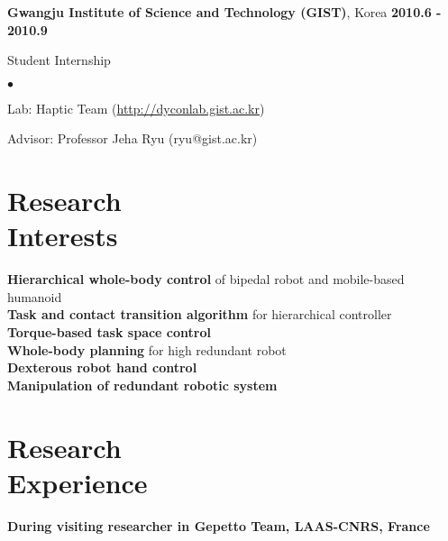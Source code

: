 \documentclass[margin,line]{res}
\newenvironment{list1}{
  \begin{list}{\ding{113}}{%
      \setlength{\itemsep}{0in}
      \setlength{\parsep}{0in} \setlength{\parskip}{0in}
      \setlength{\topsep}{0in} \setlength{\partopsep}{0in} 
      \setlength{\leftmargin}{0.17in}}}{\end{list}}
\newenvironment{list2}{
  \begin{list}{$\bullet$}{%
      \setlength{\itemsep}{0in}
      \setlength{\parsep}{0in} \setlength{\parskip}{0in}
      \setlength{\topsep}{0in} \setlength{\partopsep}{0in} 
      \setlength{\leftmargin}{0.2in}}}{\end{list}}
\begin{document}
\begin{resume}
{\bf Gwangju Institute of Science and Technology (GIST)}, Korea  \hfill {\bf 2010.6  - 2010.9} \\
\vspace*{-.1in}
\begin{list1}
\vspace*{-.05in}
\item[] Student Internship
\begin{list2}
\item Lab: Haptic Team (\url{http://dyconlab.gist.ac.kr})
\item Advisor: Professor Jeha Ryu (ryu@gist.ac.kr)
\end{list2}
\end{list1}

\section{\sc Research\\ Interests}
\textbf{Hierarchical whole-body control} of bipedal robot and mobile-based humanoid \\
\textbf{Task and contact transition algorithm} for hierarchical controller \\
\textbf{Torque-based task space control} \\
\textbf{Whole-body planning} for high redundant robot \\
\textbf{Dexterous robot hand control} \\
\textbf{Manipulation of redundant robotic system} 

\section{\sc Research\\ Experience}
{\bf During visiting researcher in Gepetto Team, LAAS-CNRS, France}
 

\end{resume}
\end{document}
